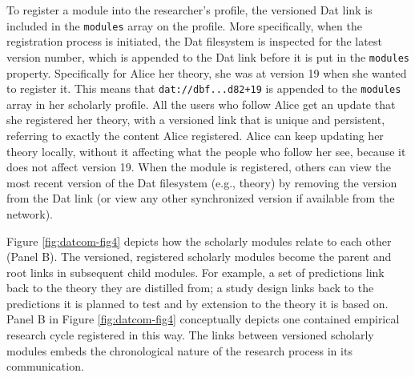 \documentclass[publications,article,submit,moreauthors,pdftex,10pt,a4paper]{Definitions/mdpi}
\begin{document}
To register a module into the researcher's profile, the versioned Dat
link is included in the \texttt{modules} array on the profile. More
specifically, when the registration process is initiated, the Dat
filesystem is inspected for the latest version number, which is appended
to the Dat link before it is put in the \texttt{modules} property.
Specifically for Alice her theory, she was at version 19 when she wanted
to register it. This means that \texttt{dat://dbf...d82+19} is appended
to the \texttt{modules} array in her scholarly profile. All the users
who follow Alice get an update that she registered her theory, with a
versioned link that is unique and persistent, referring to exactly the
content Alice registered. Alice can keep updating her theory locally,
without it affecting what the people who follow her see, because it does
not affect version 19. When the module is registered, others can view
the most recent version of the Dat filesystem (e.g., theory) by removing
the version from the Dat link (or view any other synchronized version if
available from the network).

Figure \ref{fig:datcom-fig4} depicts how the scholarly modules relate to
each other (Panel B). The versioned, registered scholarly modules become
the parent and root links in subsequent child modules. For example, a
set of predictions link back to the theory they are distilled from; a
study design links back to the predictions it is planned to test and by
extension to the theory it is based on. Panel B in Figure
\ref{fig:datcom-fig4} conceptually depicts one contained empirical
research cycle registered in this way. The links between versioned
scholarly modules embeds the chronological nature of the research
process in its communication.
\end{document}
